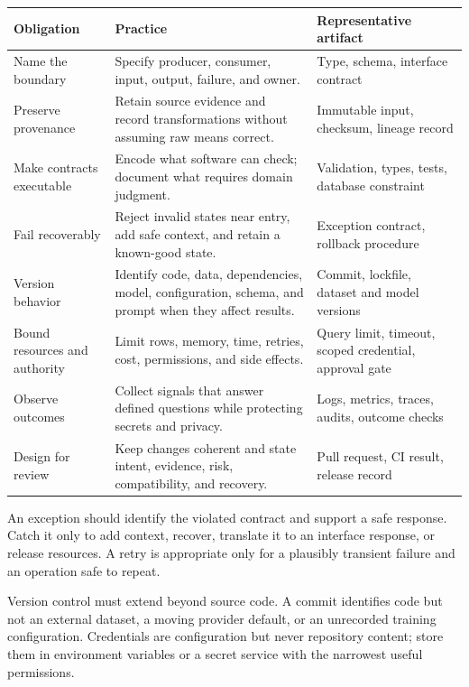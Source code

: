 \begin{longtable}{@{}
  >{\raggedright\arraybackslash}p{}
  >{\raggedright\arraybackslash}p{}
  >{\raggedright\arraybackslash}p{}@{}}
\toprule
\textbf{Obligation} & \textbf{Practice} & \textbf{Representative artifact} \\
\midrule
\endhead
Name the boundary & Specify producer, consumer, input, output, failure, and
owner. & Type, schema, interface contract \\
Preserve provenance & Retain source evidence and record transformations without
assuming raw means correct. & Immutable input, checksum, lineage record \\
Make contracts executable & Encode what software can check; document what
requires domain judgment. & Validation, types, tests, database constraint \\
Fail recoverably & Reject invalid states near entry, add safe context, and
retain a known-good state. & Exception contract, rollback procedure \\
Version behavior & Identify code, data, dependencies, model, configuration,
schema, and prompt when they affect results. & Commit, lockfile, dataset and
model versions \\
Bound resources and authority & Limit rows, memory, time, retries, cost,
permissions, and side effects. & Query limit, timeout, scoped credential,
approval gate \\
Observe outcomes & Collect signals that answer defined questions while
protecting secrets and privacy. & Logs, metrics, traces, audits, outcome checks \\
Design for review & Keep changes coherent and state intent, evidence, risk,
compatibility, and recovery. & Pull request, CI result, release record \\
\bottomrule
\end{longtable}

An exception should identify the violated contract and support a safe response.
Catch it only to add context, recover, translate it to an interface response, or
release resources. A retry is appropriate only for a plausibly transient
failure and an operation safe to repeat.

Version control must extend beyond source code. A commit identifies code but
not an external dataset, a moving provider default, or an unrecorded training
configuration. Credentials are configuration but never repository content;
store them in environment variables or a secret service with the narrowest
useful permissions.

